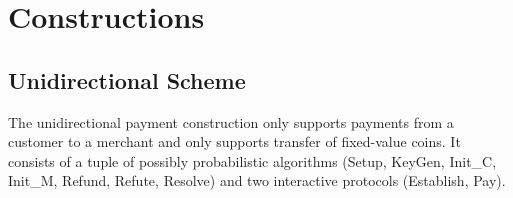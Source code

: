 \documentclass[11pt]{report}
\begin{document}
\section{Constructions}
\label{sec:constructs}

\subsection{Unidirectional Scheme}
\label{sec:unidirectional}

The unidirectional payment construction only supports payments from a customer to a merchant and only supports transfer of fixed-value coins. It consists of a tuple of possibly probabilistic algorithms ({\sf Setup}, {\sf KeyGen}, {\sf Init}_{C}, {\sf Init}_{M}, {\sf Refund}, {\sf Refute}, {\sf Resolve}) and two interactive protocols ({\sf Establish}, {\sf Pay}).
\end{document}
